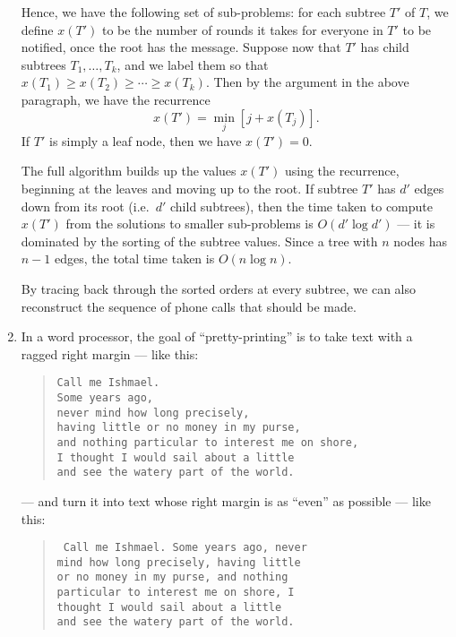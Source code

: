 \documentclass[12pt]{article}
\begin{document}
\begin{enumerate}
{Hence, we have the following set of sub-problems:
for each subtree $T'$ of $T$, we define $x(T')$
to be the number of rounds it takes for everyone
in $T'$ to be notified, once the root has the message.
Suppose now that $T'$ has child subtrees
$T_1, \ldots, T_k$, and we label them so
that $x(T_1) \geq x(T_2) \geq \cdots \geq x(T_k)$.
Then by the argument in the above paragraph,
we have the recurrence
$$x(T') = \min_j \left[ j + x(T_j) \right].$$
If $T'$ is simply a leaf node, then we have $x(T') = 0$.

The full algorithm builds up the values $x(T')$
using the recurrence, beginning at the leaves 
and moving up to the root.
If subtree $T'$ has $d'$ edges down from its root
(i.e.~$d'$ child subtrees), then the time taken
to compute $x(T')$ from the solutions to smaller
sub-problems is $O(d' \log d')$ --- it is
dominated by the sorting of the subtree values.
Since a tree with $n$ nodes has $n-1$ edges,
the total time taken is $O(n \log n)$.

By tracing back through the sorted orders
at every subtree, we can also reconstruct
the sequence of phone calls that should be made.

}



\item

 In a word processor, the goal of ``pretty-printing''
is to take text with a ragged right margin --- like this:
\begin{quote}
{\tt Call me Ishmael. \\
Some years ago, \\
never mind how long precisely, \\
having little or no money in my purse, \\
and nothing particular to interest me on shore, \\
I thought I would sail about a little  \\
and see the watery part of the world.}
\end{quote}
--- and turn it into text whose right margin is
as ``even'' as possible --- like this:
\begin{quote}
{\tt
Call me Ishmael. Some years ago, never \\
mind how long precisely, having little \\
or no money in my purse, and nothing \\
particular to interest me on shore, I \\
thought I would sail about a little  \\
and see the watery part of the world.}
\end{quote}


\end{enumerate}
\end{document}
